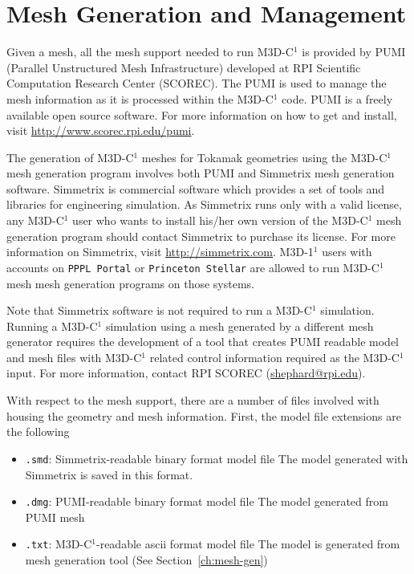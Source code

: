 \section{Mesh Generation and Management}

Given a mesh, all the mesh support needed to run M3D-C$^{1}$ is provided by PUMI (Parallel Unstructured Mesh Infrastructure) developed at RPI Scientific Computation Research Center (SCOREC). The PUMI is used to manage the mesh information as it is processed within the M3D-C$^{1}$ code. PUMI is a freely available open source software. For more information on how to get and install, visit \href{http://www.scorec.rpi.edu/pumi}{http://www.scorec.rpi.edu/pumi}.

The generation of M3D-C$^{1}$ meshes for Tokamak geometries using the M3D-C$^{1}$ mesh generation program involves both PUMI and Simmetrix mesh generation software. Simmetrix is commercial software which provides a set of tools and libraries for engineering simulation. As Simmetrix runs only with a valid license, any M3D-C$^{1}$ user who wants to install his/her own version of the M3D-C$^{1}$ mesh generation program should contact Simmetrix to purchase its license. For more information on Simmetrix, visit \href{http://simmetrix.com}{http://simmetrix.com}. {M3D-1}$^{1}$ users with accounts on \texttt{PPPL Portal} or \texttt{Princeton Stellar} are allowed to run M3D-C$^{1}$ mesh mesh generation programs on those systems.

Note that Simmetrix software is not required to run a M3D-C$^{1}$ simulation. Running a M3D-C$^{1}$ simulation using a mesh generated by a different mesh generator requires the development of a tool that creates PUMI readable model and mesh files with M3D-C$^{1}$ related control information required as the M3D-C$^{1}$ input. For more information, contact RPI SCOREC (\href{mailto:shephard@rpi.edu}{shephard@rpi.edu}).
\newline

With respect to the mesh support, there are a number of files involved with housing the geometry and mesh information. First, the model file extensions are the following
\begin{itemize}
\item \texttt{.smd}: Simmetrix-readable binary format model file  
\newline  The model generated with Simmetrix is saved in this format.
\item \texttt{.dmg}: PUMI-readable binary format model file
\newline	The model generated from PUMI mesh
\item	\texttt{.txt}: M3D-C$^{1}$-readable ascii format model file 
\newline	The model is generated from mesh generation tool (See Section~\ref{ch:mesh-gen})
\end{itemize}

